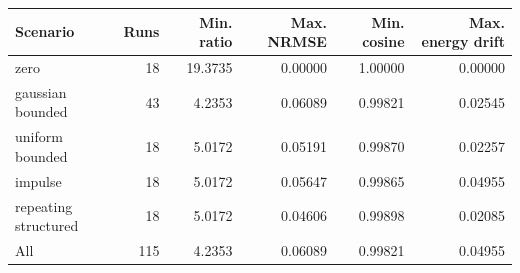 \begin{tabular}{lrrrrr}
\toprule
Scenario & Runs & Min. ratio & Max. NRMSE & Min. cosine & Max. energy drift \\
\midrule
zero & 18 & 19.3735 & 0.00000 & 1.00000 & 0.00000 \\
gaussian bounded & 43 & 4.2353 & 0.06089 & 0.99821 & 0.02545 \\
uniform bounded & 18 & 5.0172 & 0.05191 & 0.99870 & 0.02257 \\
impulse & 18 & 5.0172 & 0.05647 & 0.99865 & 0.04955 \\
repeating structured & 18 & 5.0172 & 0.04606 & 0.99898 & 0.02085 \\
\midrule
All & 115 & 4.2353 & 0.06089 & 0.99821 & 0.04955 \\
\bottomrule
\end{tabular}
